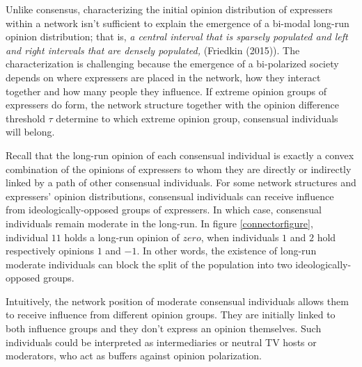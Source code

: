 \documentclass{article}
\newtheorem{lemma}{Lemma}
\newenvironment{proof}[1][Proof]{\textbf{#1.} }{\ \rule{0.5em}{0.5em}}
\begin{document}
Unlike consensus, characterizing the initial opinion distribution of expressers within a network isn't sufficient to explain the emergence of a bi-modal long-run opinion distribution; that is, \textit{a central interval that is sparsely populated and left and right intervals that are densely populated,} (Friedkin (2015)\cite{friedkin2015}). The characterization is challenging because the emergence of a bi-polarized society depends on where expressers are placed in the network, how they interact together and how many people they influence. If extreme opinion groups of expressers do form, the network structure together with the opinion difference threshold $\tau$ determine to which extreme opinion group, consensual individuals will belong. 
\smallskip

Recall that the long-run opinion of each consensual individual is exactly a convex combination of the opinions of expressers to whom they are directly or indirectly linked by a path of other consensual individuals. For some network structures and expressers' opinion distributions, consensual individuals can receive influence from ideologically-opposed groups of expressers. In which case, consensual individuals remain moderate in the long-run. In figure \ref{connectorfigure}, individual $11$ holds a long-run opinion of $zero$, when individuals $1$ and $2$ hold respectively opinions $1$ and $-1$. In other words, the existence of long-run moderate individuals can block the split of the population into two ideologically-opposed groups. 
%

Intuitively, the network position of moderate consensual individuals allows them to receive influence from different opinion groups. They are initially linked to both influence groups and they don't express an opinion themselves. Such individuals could be interpreted as intermediaries or neutral TV hosts or moderators, who act as buffers against opinion polarization. %
\end{document}
